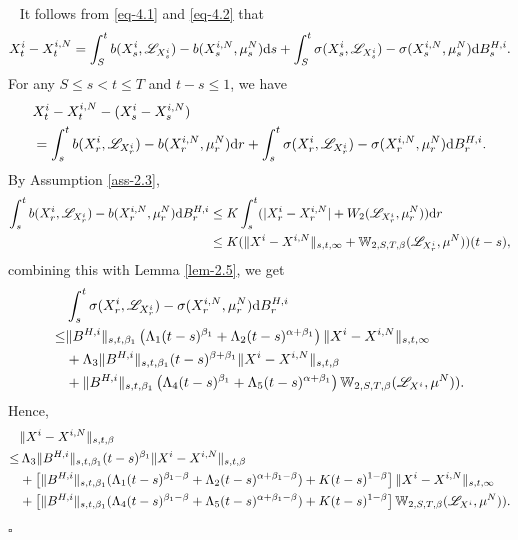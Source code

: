 \documentclass[12pt]{article}
\def\L{\mathscr{L}}
\def\d{\text{\rm{d}}}
\def\W{\mathbb{W}}
\newenvironment{proof}{{\noindent\it Proof.}\ }{\hfill $\square$\par}
\numberwithin{equation}{section}
\begin{document}
	\begin{proof}
		It follows from \eqref{eq-4.1} and \eqref{eq-4.2} that
		\begin{equation}
			\begin{aligned}
				X^{i}_t-X^{i,N}_t=\int_{S}^{t}b(X^{i}_s,\L_{X^i_s})-b(X^{i,N}_s,{\mu}^{N}_s)\d s+\int_{S}^{t}\sigma(X^{i}_s,\L_{X^i_s})-\sigma(X^{i,N}_s,{\mu}^{N}_s)\d B^{H,i}_s.
			\end{aligned}
		\end{equation}
		For any $ S\leq s<t \leq T$ and $t-s\leq 1$, we have
		\begin{equation}
			\begin{aligned}
				&X^{i}_t-X^{i,N}_t-(X^{i}_s-X^{i,N}_s)\\
				&=\int_{s}^{t}b(X^{i}_r,\L_{X^i_r})-b(X^{i,N}_r,{\mu}^{N}_r)\d r+\int_{s}^{t}\sigma(X^{i}_r,\L_{X^i_r})-\sigma(X^{i,N}_r,{\mu}^{N}_r)\d B^{H,i}_r.
			\end{aligned}
		\end{equation}
		By Assumption \ref{ass-2.3},
		\begin{align*}
			\int_{s}^{t}b(X^{i}_r,\L_{X^i_r})-b(X^{i,N}_r,{\mu}^{N}_r)\d B^{H,i}_r&\leq K\int_{s}^{t}(|X^{i}_r-X^{i,N}_r|+W_2(\L_{X^i_r}, \mu_r^{N}))\d r\\
			&\leq K(\|X^{i}-X^{i,N}\|_{s,t,\infty}+\W_{2,S,T,\beta}(\L_{X^i_r}, \mu^{N}))(t-s),
		\end{align*}
		combining this with Lemma \ref{lem-2.5}, we get
		\begin{align*}
			&\int_{s}^{t}\sigma(X^{i}_r,\L_{X^i_r})-\sigma(X^{i,N}_r,{\mu}^{N}_r)\d B^{H,i}_r\\
			\le&\|B^{H,i}\|_{s,t,\beta_1} \left(\Lambda_1 (t-s)^{\beta_1}+\Lambda_2  (t-s)^{\alpha+\beta_1}\right)\|X^i-X^{i,N}\|_{s,t,\infty}\cr
			&+\Lambda_3 \|B^{H,i}\|_{s,t,\beta_1} (t-s)^{\beta+\beta_1}\|X^i-X^{i,N}\|_{s,t,\beta}\cr
			&+\|B^{H,i}\|_{s,t,\beta_1} \left(\Lambda_4 (t-s)^{\beta_1}+\Lambda_5 (t-s)^{\alpha+\beta_1}\right)\W_{2,S,T,\beta}(\L_{X^i}, \mu^{N})).
		\end{align*}
		Hence,
		\begin{align*}
			&\|X^{i}-X^{i,N}\|_{s,t,\beta}\\
			\le& \,\Lambda_3\|B^{H,i}\|_{s,t,\beta_1} (t-s)^{ \beta_1}\|X^i-X^{i,N}\|_{s,t,\beta}\cr
			&+\left[\|B^{H,i}\|_{s,t,\beta_1} (\Lambda_1(t-s)^{\beta_1-\beta}+\Lambda_2(t-s)^{\alpha+\beta_1-\beta})+K(t-s)^{1-\beta}\right]\|X^i-X^{i,N}\|_{s,t,\infty}\cr
			&+\left[\|B^{H,i}\|_{s,t,\beta_1} (\Lambda_4(t-s)^{\beta_1-\beta}+\Lambda_5(t-s)^{\alpha+\beta_1-\beta})+K(t-s)^{1-\beta}\right]\W_{2,S,T,\beta}(\L_{X^i}, \mu^{N})).

\end{align*}
\end{proof}
\end{document}
